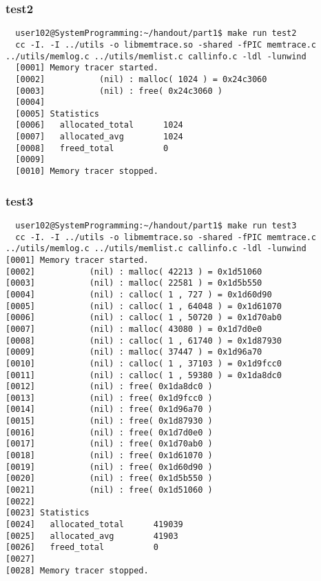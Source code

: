 \documentclass{report}
\begin{document}
\subsubsection{test2}
\begin{verbatim}
  user102@SystemProgramming:~/handout/part1$ make run test2
  cc -I. -I ../utils -o libmemtrace.so -shared -fPIC memtrace.c ../utils/memlog.c ../utils/memlist.c callinfo.c -ldl -lunwind
  [0001] Memory tracer started.
  [0002]           (nil) : malloc( 1024 ) = 0x24c3060
  [0003]           (nil) : free( 0x24c3060 )
  [0004]
  [0005] Statistics
  [0006]   allocated_total      1024
  [0007]   allocated_avg        1024
  [0008]   freed_total          0
  [0009]
  [0010] Memory tracer stopped.
\end{verbatim}

\subsubsection{test3}
\begin{verbatim}
  user102@SystemProgramming:~/handout/part1$ make run test3
  cc -I. -I ../utils -o libmemtrace.so -shared -fPIC memtrace.c ../utils/memlog.c ../utils/memlist.c callinfo.c -ldl -lunwind
[0001] Memory tracer started.
[0002]           (nil) : malloc( 42213 ) = 0x1d51060
[0003]           (nil) : malloc( 22581 ) = 0x1d5b550
[0004]           (nil) : calloc( 1 , 727 ) = 0x1d60d90
[0005]           (nil) : calloc( 1 , 64048 ) = 0x1d61070
[0006]           (nil) : calloc( 1 , 50720 ) = 0x1d70ab0
[0007]           (nil) : malloc( 43080 ) = 0x1d7d0e0
[0008]           (nil) : calloc( 1 , 61740 ) = 0x1d87930
[0009]           (nil) : malloc( 37447 ) = 0x1d96a70
[0010]           (nil) : calloc( 1 , 37103 ) = 0x1d9fcc0
[0011]           (nil) : calloc( 1 , 59380 ) = 0x1da8dc0
[0012]           (nil) : free( 0x1da8dc0 )
[0013]           (nil) : free( 0x1d9fcc0 )
[0014]           (nil) : free( 0x1d96a70 )
[0015]           (nil) : free( 0x1d87930 )
[0016]           (nil) : free( 0x1d7d0e0 )
[0017]           (nil) : free( 0x1d70ab0 )
[0018]           (nil) : free( 0x1d61070 )
[0019]           (nil) : free( 0x1d60d90 )
[0020]           (nil) : free( 0x1d5b550 )
[0021]           (nil) : free( 0x1d51060 )
[0022]
[0023] Statistics
[0024]   allocated_total      419039
[0025]   allocated_avg        41903
[0026]   freed_total          0
[0027]
[0028] Memory tracer stopped.
\end{verbatim}
\end{document}
